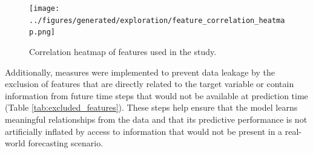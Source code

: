 \begin{figure}[h]
    \centering
    \texttt{[image: ../figures/generated/exploration/feature\_correlation\_heatmap.png]}
    \caption{Correlation heatmap of features used in the study.}
    \label{fig:correlation_heatmap}
\end{figure}

Additionally, measures were implemented to prevent data leakage by the exclusion of features that are directly related to the target variable or contain information from future time steps that would not be available at prediction time (Table \ref{tab:excluded_features}). These steps help ensure that the model learns meaningful relationships from the data and that its predictive performance is not artificially inflated by access to information that would not be present in a real-world forecasting scenario.

